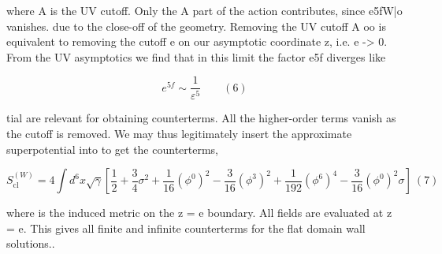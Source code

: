 \documentclass{article}
\begin{document}
where A is the UV cutoff. Only the A part of the action contributes, since e5fW|o vanishes.
due to the close-off of the geometry. Removing the UV cutoff A  oo is equivalent to
removing the cutoff e on our asymptotic coordinate z, i.e. e -> 0. From the UV asymptotics
we find that in this limit the factor e5f diverges like


\begin{equation}
e ^ { 5 f } \sim \frac { 1 } { \varepsilon ^ { 5 } } \qquad ( 6 )
\end{equation}


tial are relevant for obtaining counterterms. All the higher-order terms vanish as the cutoff
is removed. We may thus legitimately insert the approximate superpotential into to get the
counterterms,


\begin{equation}
S _ { \mathrm { c l } } ^ { ( W ) } = 4 \int d ^ { 6 } x \sqrt { \gamma } \left [ \frac { 1 } { 2 } + \frac { 3 } { 4 } \sigma ^ { 2 } + \frac { 1 } { 1 6 } ( \phi ^ { 0 } ) ^ { 2 } - \frac { 3 } { 1 6 } ( \phi ^ { 3 } ) ^ { 2 } + \frac { 1 } { 1 9 2 } ( \phi ^ { 6 } ) ^ { 4 } - \frac { 3 } { 1 6 } ( \phi ^ { 0 } ) ^ { 2 } \sigma \right ] ~ ( 7 )
\end{equation}


where  is the induced metric on the z = e boundary. All fields are evaluated at z = e. This
gives all finite and infinite counterterms for the flat domain wall solutions..
\end{document}
